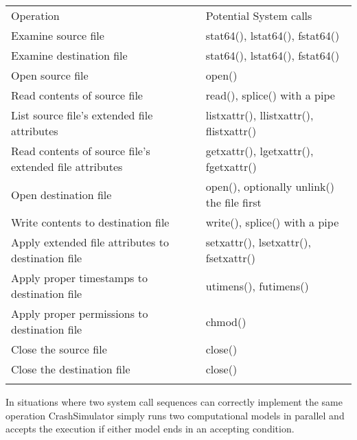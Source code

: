         \begin{table*}[t]
            \scriptsize{}
            \begin{tabular}{l | l }
            \toprule{}
              Operation                                               & Potential System calls\\
              Examine source file                                     & stat64(), lstat64(), fstat64()\\
              Examine destination file                                & stat64(), lstat64(), fstat64()\\
              Open source file                                        & open()\\
              Read contents of source file                            & read(), splice() with a pipe\\
              List source file's extended file attributes             & listxattr(), llistxattr(), flistxattr()\\
              Read contents of source file's extended file attributes & getxattr(), lgetxattr(), fgetxattr()\\
              Open destination file                                   & open(), optionally unlink() the file first\\
              Write contents to destination file                      & write(), splice() with a pipe\\
              Apply extended file attributes to destination file      & setxattr(), lsetxattr(), fsetxattr()\\
              Apply proper timestamps to destination file             & utimens(), futimens()\\
              Apply proper permissions to destination file            & chmod()\\
              Close the source file                                   & close()\\
              Close the destination file                              & close()\\

              
            \bottomrule{}
            \end{tabular}
        \end{table*}
    
   In situations where two system call sequences can correctly implement the same operation CrashSimulator simply runs
   two computational models in parallel and accepts the execution if either model ends in an accepting condition. 

